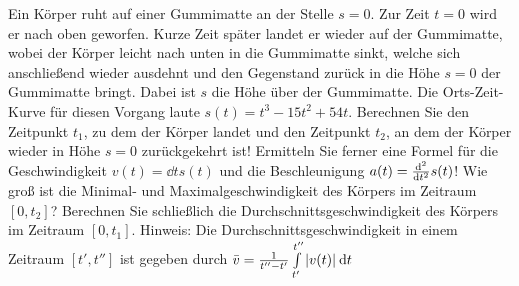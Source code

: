 \item Ein Körper ruht auf einer Gummimatte an der Stelle $s=0$. Zur Zeit $t=0$ wird er nach oben geworfen. Kurze Zeit später landet er wieder auf der Gummimatte, wobei der Körper leicht nach unten in die Gummimatte sinkt, welche sich anschließend wieder ausdehnt und den Gegenstand zurück in die Höhe $s=0$ der Gummimatte bringt. Dabei ist $s$ die Höhe über der Gummimatte.  Die Orts-Zeit-Kurve für diesen Vorgang laute $s(t) = t^3-15t^2+54t$. Berechnen Sie den Zeitpunkt $t_1$, zu dem der Körper landet und den Zeitpunkt $t_2$, an dem der Körper wieder in Höhe $s=0$ zurückgekehrt ist! Ermitteln Sie ferner eine Formel für die Geschwindigkeit $v(t) = \dd{}{t}s(t)$ und die Beschleunigung $a(t) = \frac{\mathrm{d}^{2}{}}{\mathrm{d}{t^{2}}}s(t)$! Wie groß ist die Minimal- und Maximalgeschwindigkeit des Körpers im Zeitraum $[0,t_2]$? Berechnen Sie schließlich die Durchschnittsgeschwindigkeit des Körpers im Zeitraum $[0,t_1]$. Hinweis: Die Durchschnittsgeschwindigkeit in einem Zeitraum $[t',t'']$ ist gegeben durch $\bar{v} = \frac{1}{t''-t'}\int\limits_{t'}^{t''} |v(t)| \:\mathrm{d}{t}$